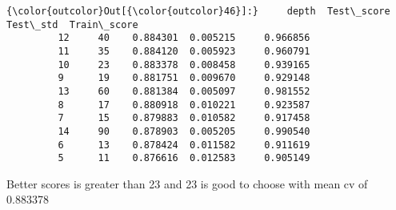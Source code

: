 \documentclass[11pt]{article}
\begin{document}
\begin{Verbatim}[commandchars=\\\{\}]
{\color{outcolor}Out[{\color{outcolor}46}]:}     depth  Test\_score  Test\_std  Train\_score
         12     40    0.884301  0.005215     0.966856
         11     35    0.884120  0.005923     0.960791
         10     23    0.883378  0.008458     0.939165
         9      19    0.881751  0.009670     0.929148
         13     60    0.881384  0.005097     0.981552
         8      17    0.880918  0.010221     0.923587
         7      15    0.879883  0.010582     0.917458
         14     90    0.878903  0.005205     0.990540
         6      13    0.878424  0.011582     0.911619
         5      11    0.876616  0.012583     0.905149
\end{Verbatim}
            
    Better scores is greater than 23 and 23 is good to choose with mean cv
of 0.883378
\end{document}
